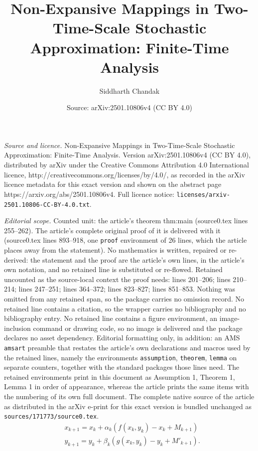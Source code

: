 \documentclass[10pt,a4paper]{amsart}
\title{Non-Expansive Mappings in Two-Time-Scale Stochastic Approximation: Finite-Time Analysis}
\author{Siddharth Chandak}
\date{Source: arXiv:2501.10806v4 (CC BY 4.0)}
\begin{document}
\maketitle

\noindent\emph{Source and licence.} Non-Expansive Mappings in Two-Time-Scale Stochastic Approximation: Finite-Time Analysis. Version arXiv:2501.10806v4 (CC BY 4.0), distributed by arXiv under the Creative Commons Attribution 4.0 International licence, http://creativecommons.org/licenses/by/4.0/, as recorded in the arXiv licence metadata for this exact version and shown on the abstract page https://arxiv.org/abs/2501.10806v4. Full licence notice: \texttt{licenses/arxiv-2501.10806-CC-BY-4.0.txt}.\par\smallskip

\noindent\textit{Editorial scope.} Counted unit: the article's theorem thm:main (source0.tex lines 255--262). The article's complete original proof of it is delivered with it (source0.tex lines 893--918, one \texttt{proof} environment of 26 lines, which the article places away from the statement). No mathematics is written, repaired or re-derived: the statement and the proof are the article's own lines, in the article's own notation, and no retained line is substituted or re-flowed.  Retained uncounted as the source-local context the proof needs: lines 201--206; lines 210--214; lines 247--251; lines 364--372; lines 823--827; lines 851--853.  Nothing was omitted from any retained span, so the package carries no omission record.  No retained line contains a citation, so the wrapper carries no bibliography and no bibliography entry.  No retained line contains a figure environment, an image-inclusion command or drawing code, so no image is delivered and the package declares no asset dependency.  Editorial formatting only, in addition: an AMS \texttt{amsart} preamble that restates the article's own declarations and macros used by the retained lines, namely the environments \texttt{assumption}, \texttt{theorem}, \texttt{lemma} on separate counters, together with the standard packages those lines need.  The retained environments print in this document as Assumption 1, Theorem 1, Lemma 1 in order of appearance, whereas the article prints the same items with the numbering of its own full document.  The complete native source of the article as distributed in the arXiv e-print for this exact version is bundled unchanged as \texttt{sources/171773/source0.tex}.
\begin{equation}\label{iter-main}
    \begin{aligned}
    &x_{k+1}=x_k+\alpha_k(f(x_k,y_k)-x_k+M_{k+1})\\
    &y_{k+1}=y_k+\beta_k(g(x_k,y_k)-y_k+M'_{k+1}).
\end{aligned}
\end{equation}
\end{document}
